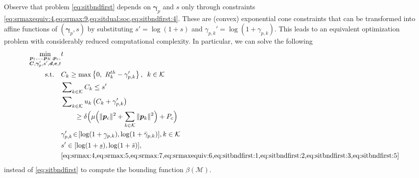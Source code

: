 \documentclass[a4paper,10pt,journal]{IEEEtran}
\let\vec\bm
\newcommand{\ubar}[1]{\underaccent{\bar}{#1}}
\begin{document}
Observe that problem \cref{eq:sitbndfirst} depends on $\vec\gamma_p$ and $s$ only through constraints \cref{eq:srmaxequiv:4,eq:srmax:9,eq:sitdual:soc,eq:sitbndfirst:4}. These are (convex) exponential cone constraints that can be transformed into affine functions of $(\vec\gamma_p, s)$ by substituting $s' = \log(1 + s)$ and $\gamma_{p,k}' = \log( 1 + \gamma_{p,k})$. This leads to an equivalent optimization problem with considerably reduced computational complexity. In particular, we can solve the following 
\begin{subequations} \label{eq:sitbnd}
	\begin{align}
		\min_{\substack{\vec p_1, \dots, \vec p_K, \vec p_c,\\ \vec C, \vec \gamma_p', s', \vec d, \vec e, t}} & t \\
	\mbox{s.t.}\quad
%
	& C_k \geq \max \left\{ 0,\ R_k^{th} - \gamma_{p,k}' \right\},\enskip  k\in\mathcal{K} \\
	& \sum\nolimits_{k\in \mathcal{K}}C_{k}\leq s' \\
	& \sum\nolimits_{k\in\mathcal{K}} u_k \left(C_k+\gamma_{p,k}' \right) \notag\\
	& \qquad\ge \delta \Big( \mu \Big( \Vert \vec p_c \Vert^2 + \sum\limits_{k\in\mathcal K} \Vert \vec p_k \Vert^2 \Big) + P_c \Big) \\
	& \gamma'_{p,k} \!\in\! [\log(1+\ubar{\gamma}_{p,k}), \log(1+\bar{\gamma}_{p,k})], k\in\mathcal K \\
	& s'\in [\log(1+\ubar s), \log(1+\bar s)], \\
	& \text{\cref{eq:srmax:4,eq:srmax:5,eq:srmax:7,eq:srmaxequiv:6,eq:sitbndfirst:1,eq:sitbndfirst:2,eq:sitbndfirst:3,eq:sitbndfirst:5}}
	\end{align}
\end{subequations}
instead of \cref{eq:sitbndfirst} to compute the bounding function $\beta(\mathcal M)$.
\end{document}

